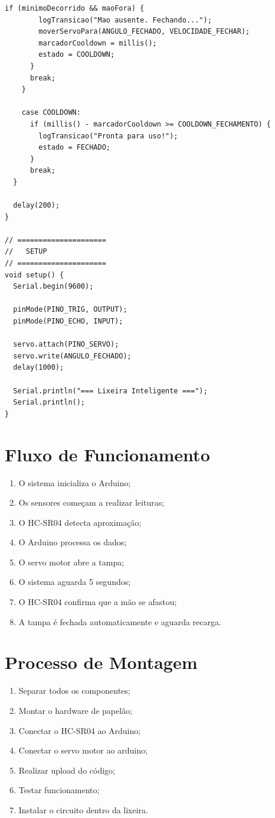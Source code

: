 \documentclass[12pt, openany, oneside, a4paper, brazilian]{abntex2}
\begin{document}
\begin{lstlisting}[caption={Código Arduino da lixeira automática}]
      if (minimoDecorrido && maoFora) {
        logTransicao("Mao ausente. Fechando...");
        moverServoPara(ANGULO_FECHADO, VELOCIDADE_FECHAR);
        marcadorCooldown = millis();
        estado = COOLDOWN;
      }
      break;
    }

    case COOLDOWN:
      if (millis() - marcadorCooldown >= COOLDOWN_FECHAMENTO) {
        logTransicao("Pronta para uso!");
        estado = FECHADO;
      }
      break;
  }

  delay(200); 
}

// =====================
//   SETUP
// =====================
void setup() {
  Serial.begin(9600); 
  
  pinMode(PINO_TRIG, OUTPUT); 
  pinMode(PINO_ECHO, INPUT);  
  
  servo.attach(PINO_SERVO); 
  servo.write(ANGULO_FECHADO); 
  delay(1000);
  
  Serial.println("=== Lixeira Inteligente ===");
  Serial.println();
}

\end{lstlisting}

\section{Fluxo de Funcionamento}

\begin{enumerate}
    \item O sistema inicializa o Arduino;
    \item Os sensores começam a realizar leituras;
    \item O HC-SR04 detecta aproximação;
    \item O Arduino processa os dados;
    \item O servo motor abre a tampa;
    \item O sistema aguarda 5 segundos;
    \item O HC-SR04 confirma que a mão se afastou;
    \item A tampa é fechada automaticamente e aguarda recarga.
\end{enumerate}

\section{Processo de Montagem}

\begin{enumerate} 
    \item Separar todos os componentes;
    \item Montar o hardware de papelão;
    \item Conectar o HC-SR04 ao Arduino;
    \item Conectar o servo motor ao arduino;
    \item Realizar upload do código;
    \item Testar funcionamento;
    \item Instalar o circuito dentro da lixeira.
\end{enumerate}
\end{document}
